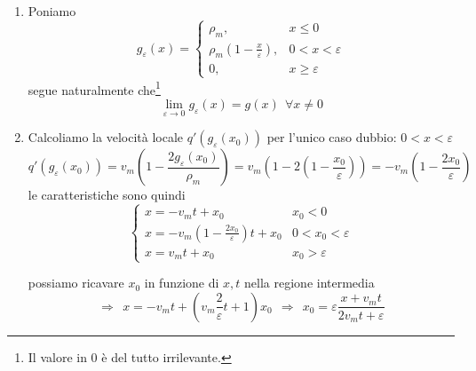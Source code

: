 \documentclass[10pt,a4paper,twoside,openright]{book}
\begin{document}

\begin{enumerate}
	\item Poniamo
	      \begin{equation*}
	      	g_{\varepsilon }( x) =
	      	\begin{cases}
	      		\rho _{m} ,                                       & x\leqslant 0           \\
	      		\rho _{m}\left( 1-\frac{x}{\varepsilon }\right) , & 0< x< \varepsilon      \\
	      		0,                                                & x\geqslant \varepsilon 
	      	\end{cases}
	      \end{equation*}segue naturalmente che\footnote{Il valore in $0$ è del tutto irrilevante.}
	      \begin{equation*}
	      	\lim\limits _{\varepsilon \rightarrow 0} g_{\varepsilon }( x) =g( x) \ \ \forall x\neq 0
	      \end{equation*}
	\item Calcoliamo la velocità locale $q'( g_{\varepsilon }( x_{0}))$ per l'unico caso dubbio: $0< x< \varepsilon $
	      \begin{equation*}
	      	q'( g_{\varepsilon }( x_{0})) =v_{m}\left( 1-\frac{2g_{\varepsilon }( x_{0})}{\rho _{m}}\right) =v_{m}\left( 1-2\left( 1-\frac{x_{0}}{\varepsilon }\right)\right) =-v_{m}\left( 1-\frac{2x_{0}}{\varepsilon }\right)
	      \end{equation*}le caratteristiche sono quindi
	      \begin{equation*}
	      	\begin{cases}
	      		x=-v_{m} t+x_{0}                                            & x_{0} < 0              \\
	      		x=-v_{m}\left( 1-\frac{2x_{0}}{\varepsilon }\right) t+x_{0} & 0< x_{0} < \varepsilon \\
	      		x=v_{m} t+x_{0}                                             & x_{0}  >\varepsilon    
	      	\end{cases}
	      \end{equation*}
	      
	      possiamo ricavare $x_{0}$ in funzione di $x,t$ nella regione intermedia
	      \begin{equation*}
	      	\Rightarrow \ \ x=-v_{m}t +\left( v_{m}\frac{2}{\varepsilon } t+1\right) x_{0} \ \ \Rightarrow \ \ x_{0} =\varepsilon \frac{x+v_{m}t}{2v_{m} t+\varepsilon }
	      \end{equation*}
	      

\end{enumerate}
\end{document}
